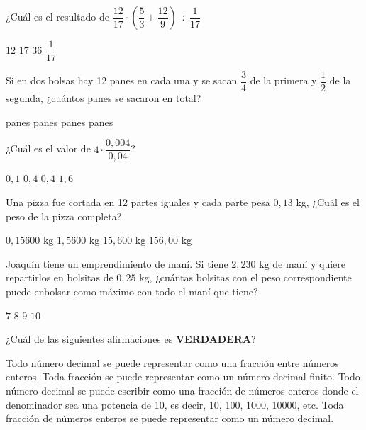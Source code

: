 \documentclass[spanish,letterpaper, 12pt, addpoints, answers]{exam}
\begin{document}
\begin{questions}
\newpage
    \question[1] ¿Cuál es el resultado de $\dfrac{12}{17}\cdot \left(\dfrac{5}{3}+\dfrac{12}{9}\right)\div \dfrac{1}{17}$
    \begin{choices}
        \choice $12$
        \choice $17$
        \CorrectChoice $36$
        \choice $\dfrac{1}{17}$
    \end{choices}
    \vspace{0.15in}

    \question[1] Si en dos bolsas hay 12 panes en cada una y se sacan $\dfrac{3}{4}$ de la primera y $\dfrac{1}{2}$ de la segunda, ¿cuántos panes se sacaron en total?
    \begin{choices}
         panes
         panes
         panes
         panes
    \end{choices}
    \vspace{0.15in}

    \question[1] ¿Cuál es el valor de $4\cdot \dfrac{0,004}{0,04}$?
    \begin{choices}
        \choice $0,1$
        \CorrectChoice $0,4$
        \choice $0,\overline{4}$
        \choice $1,6$
    \end{choices}
    \vspace{0.15in}

    \question[1] Una pizza fue cortada en 12 partes iguales y cada parte pesa $0,13$ kg, ¿Cuál es el peso de la pizza completa?
    \begin{choices}
        \choice $0,15600$ kg
        \CorrectChoice $1,5600$ kg
        \choice $15,600$ kg
        \choice $156,00$ kg
    \end{choices}
    \vspace{0.15in}

    \question[1] Joaquín tiene un emprendimiento de maní. Si tiene $2,230$ kg de maní y quiere repartirlos en bolsitas de $0,25$ kg, ¿cuántas bolsitas con el peso correspondiente puede enbolsar como máximo con todo el maní que tiene?
    \begin{choices}
        \choice $7$
        \CorrectChoice $8$
        \choice $9$
        \choice $10$
    \end{choices}
    \vspace{0.15in}

    \question[1] ¿Cuál de las siguientes afirmaciones es \textbf{VERDADERA}?

    \begin{choices}
        \choice Todo número decimal se puede representar como una fracción entre números enteros.
        \choice Toda fracción se puede representar como un número decimal finito.
        \choice Todo número decimal se puede escribir como una fracción de números enteros donde el denominador sea una potencia de 10, es decir, 10, 100, 1000, 10000, etc.
        \CorrectChoice Toda fracción de números enteros se puede representar como un número decimal.
    \end{choices}
    \vspace{0.15in}


\end{questions}
\end{document}
